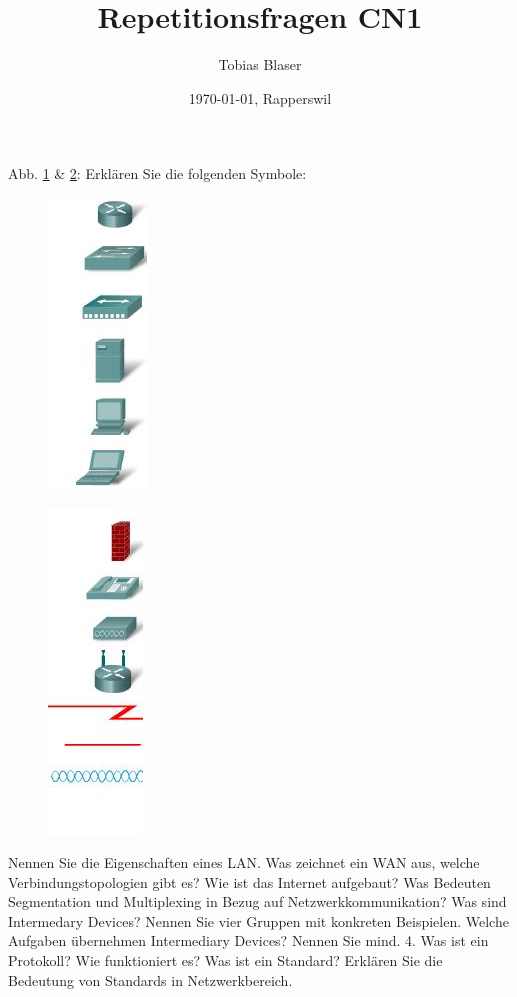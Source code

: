 \documentclass[ngerman,a4paper,12pt]{scrreprt}
\title{Repetitionsfragen CN1}
\author{Tobias Blaser}
\date{\today{}, Rapperswil}
\begin{document}
\tableofcontents
\clearpage


\ol
	\li Abb. \ref{symb1} \& \ref{symb2}: Erklären Sie die folgenden Symbole: 
		\begin{figure}[H]
			\caption{}
			\includegraphics[scale=0.60]{img/R1.1.jpg}
			\label{symb1}
		\end{figure}
		\begin{figure}[H]
			\caption{}
			\includegraphics[scale=0.60]{img/R1.2.jpg}
			\label{symb2}
		\end{figure}			 
	\li Nennen Sie die Eigenschaften eines LAN.
	\li Was zeichnet ein WAN aus, welche Verbindungstopologien gibt es?
	\li Wie ist das Internet aufgebaut?
	\li Was Bedeuten Segmentation und Multiplexing in Bezug auf Netzwerkkommunikation?
	\li Was sind Intermedary Devices? Nennen Sie vier Gruppen mit konkreten Beispielen.
	\li Welche Aufgaben übernehmen Intermediary Devices? Nennen Sie mind. 4.
	\li Was ist ein Protokoll? Wie funktioniert es?
	\li Was ist ein Standard? Erklären Sie die Bedeutung von Standards in Netzwerkbereich.
\end{document}
